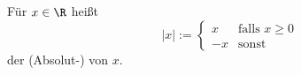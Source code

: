 Für $x \in \R$ heißt
$$|x| := \begin{cases} 
x & \text{falls $x \geq 0$}\\ 
-x & \text{sonst}
\end{cases}
$$
der (Absolut-) von $x$.